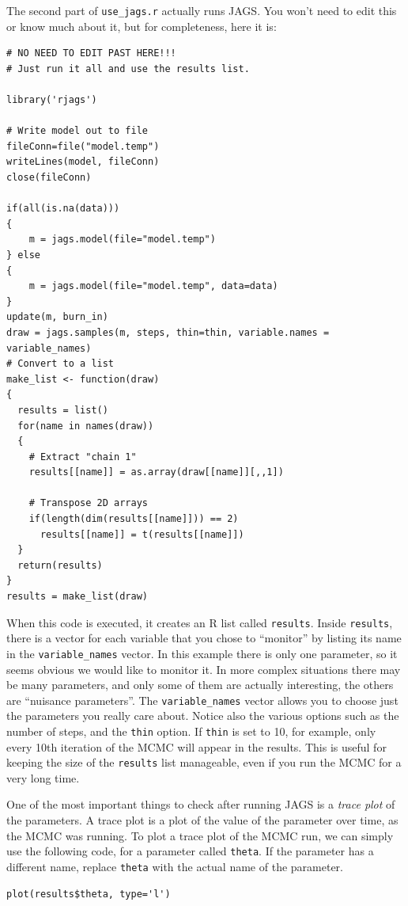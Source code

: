 The second part of {\tt use\_jags.r} actually runs JAGS. You won't need to edit
this or know much about it, but for completeness, here it is:

\begin{framed}
\begin{verbatim}
# NO NEED TO EDIT PAST HERE!!!
# Just run it all and use the results list.

library('rjags')

# Write model out to file
fileConn=file("model.temp")
writeLines(model, fileConn)
close(fileConn)

if(all(is.na(data)))
{
    m = jags.model(file="model.temp")
} else
{
    m = jags.model(file="model.temp", data=data)
}
update(m, burn_in)
draw = jags.samples(m, steps, thin=thin, variable.names = variable_names)
# Convert to a list
make_list <- function(draw)
{
  results = list()
  for(name in names(draw))
  {
    # Extract "chain 1"
    results[[name]] = as.array(draw[[name]][,,1])
    
    # Transpose 2D arrays
    if(length(dim(results[[name]])) == 2)
      results[[name]] = t(results[[name]])
  }
  return(results)
}
results = make_list(draw)
\end{verbatim}
\end{framed}

When this code is executed, it creates an R list called {\tt results}.
Inside {\tt results}, there is a vector
for each variable that you chose to ``monitor'' by listing its name in
the {\tt variable\_names} vector. In this example there is only one parameter,
so it seems obvious we would like to monitor it. In more complex situations there
may be many parameters, and only some of them are actually interesting, the others
are ``nuisance parameters''. The {\tt variable\_names} vector allows you to choose
just the parameters you really care about.
Notice also the various options such as the number of steps, and the {\tt thin}
option. If {\tt thin} is set to 10, for example, only every 10th iteration
of the MCMC will appear in the results. This is useful for keeping the size
of the {\tt results} list manageable, even if you run the MCMC for a very
long time.

One of the most important things to check after running JAGS is a {\it trace
plot} of the parameters. A trace plot is a plot of the value of the parameter
over time, as the MCMC was running.
To plot a trace plot of the MCMC run, we can simply use the following code,
for a parameter called {\tt theta}. If the parameter has a different name,
replace {\tt theta} with the actual name of the parameter.
\begin{framed}
\begin{verbatim}
plot(results$theta, type='l')
\end{verbatim}
\end{framed}

